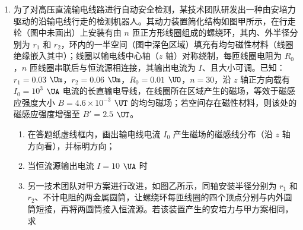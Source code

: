 \documentclass[\gkver]{gaokaozhenti}
\begin{document}
\begin{enumerate}
\item
为了对高压直流输电线路进行自动安全检测，某技术团队研发出一种由安培力驱动的沿输电线行走的检测机器人。其动力装置简化结构如图甲所示，在行走轮（图中未画出）上安装有由 $n$ 匝正方形线圈组成的螺绕环，其内、外半径分别为 $r_{1}$ 和 $r_{2}$，环内的一半空间（图中深色区域）填充有均匀磁性材料（线圈绝缘嵌入其中）；线圈以输电线中心轴（$z$ 轴）对称绕制，每匝线圈电阻为 $R_{0}$，$n$ 匝线圈串联后与恒流源相连接，其输出电流为 $I$、且大小可调。已知：$r_{1}=0.03$ $\Um$，$r_{2}=0.06$ $\Um$，$R_{0}=0.01$ $\UO$，$n=30$，沿 $z$ 轴正方向载有 $I_{0}=10^{3}$ $\UA$ 电流的长直输电导线，在线圈所在区域产生的磁场，等效于磁感应强度大小 $B=4.6\times10^{-3}$ $\UT$ 的均匀磁场；若空间存在磁性材料，则该处的磁感应强度增强至 $B'=2.5$ $\UT$。
\begin{enumerate}
	\item
	在答题纸虚线框内，画出输电线电流 $I_{0}$ 产生磁场的磁感线分布（沿 $z$ 轴方向看），并标明方向；
	\item
	当恒流源输出电流 $I=10$ $\UA$ 时
	\item
	另一技术团队对甲方案进行改进，如图乙所示，同轴安装半径分别为 $r_{1}$ 和 $r_{2}$、不计电阻的两金属圆筒，让螺绕环每匝线圈的四个顶点分别与内外圆筒短接，再将两圆筒接入恒流源。若该装置产生的安培力与甲方案相同，求
\end{enumerate}
\end{enumerate}
\end{document}
